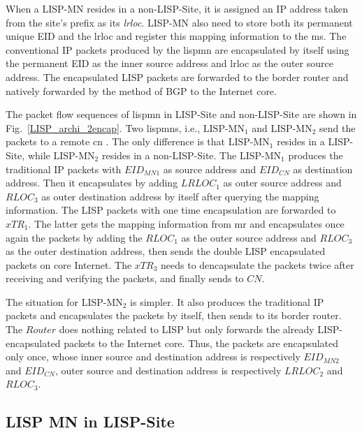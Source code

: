 When a LISP-MN resides in a non-LISP-Site, it is assigned an IP address taken from the site's prefix as its \emph{\acrshort{lrloc}}. LISP-MN also need to store both its permanent unique EID and the \acrshort{lrloc} and register this mapping information to the \acrshort{ms}. The conventional IP packets produced by the \acrshort{lispmn} are encapsulated by itself using the permanent EID as the inner source address and \acrshort{lrloc} as the outer source address. The encapsulated LISP packets are forwarded to the border router and natively forwarded by the method of BGP to the Internet core. 

The packet flow sequences of \acrshort{lispmn} in LISP-Site and non-LISP-Site are shown in Fig.~\ref{LISP_archi_2encap}. Two \acrshort{lispmn}s, i.e., $\text{LISP-MN}_1$ and $\text{LISP-MN}_2$ send the packets to a remote \acrfull{cn} . The only difference is that $\text{LISP-MN}_1$ resides in a LISP-Site, while $\text{LISP-MN}_2$ resides in a non-LISP-Site. The $\text{LISP-MN}_1$ produces the traditional IP packets with $EID_{MN1}$ as source address and $EID_{CN}$ as destination address. Then it encapsulates by adding $LRLOC_1$ as outer source address and $RLOC_3$ as outer destination address by itself after querying the mapping information. The LISP packets with one time encapsulation are forwarded to $xTR_1$. The latter gets the mapping information from \acrshort{mr} and encapsulates once again the packets by adding the $RLOC_1$ as the outer source address and $RLOC_3$ as the outer destination address, then sends the double LISP encapsulated packets on core Internet. The $xTR_3$ needs to dencapsulate the packets twice after receiving and verifying the packets, and finally sends to $CN$.

The situation for $\text{LISP-MN}_2$ is simpler. It also produces the traditional IP packets and encapsulates the packets by itself, then sends to its border router. The $Router$ does nothing related to LISP but only forwards the already LISP-encapsulated packets to the Internet core. Thus, the packets are encapsulated only once, whose inner source and destination address is respectively $EID_{MN2}$ and $EID_{CN}$, outer source and destination address is respectively $LRLOC_2$ and $RLOC_3$.


\subsection{LISP MN in LISP-Site}
\label{subsec:lispMN_LS}

